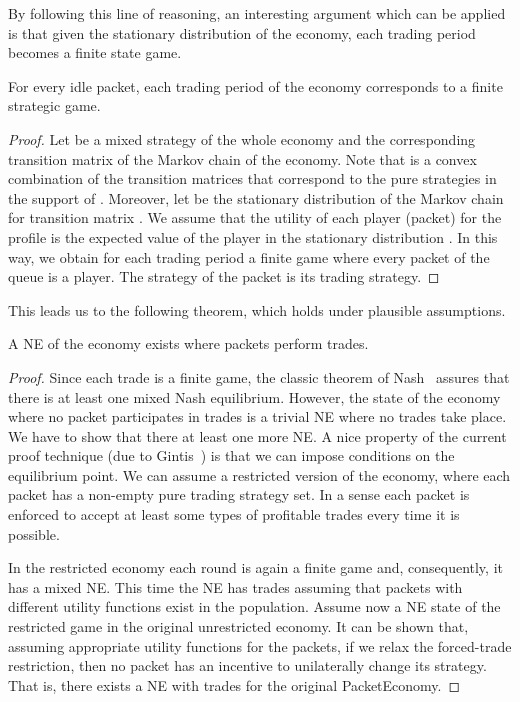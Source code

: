\documentclass[letterpaper,10pt]{llncs}
\newcommand{\hla}[1]{\hl{#1}}
\renewcommand{\hla}[1]{#1}
\begin{document}
\noindent
By following this line of reasoning, an interesting argument which can be applied is that
given the stationary distribution of the economy, each trading period becomes a finite state game. 

\begin{lemma}
\label{lem:FiniteGame}
For every idle packet, each trading period of the economy corresponds to a finite strategic game.
\end{lemma}

\begin{proof}
Let  be a mixed strategy of the whole economy and  the corresponding transition matrix of the Markov chain of the economy. 
\hla{Note that  is a convex combination of the transition
matrices  that correspond to the pure strategies  in the support of .}
Moreover, let  be the stationary distribution of the Markov chain for
transition matrix . We assume that the utility of each player (packet) 
for the profile  is the expected value of the player in the stationary 
distribution . In this way, we obtain for each trading period a finite 
game where every packet of the queue is a player. The strategy of the packet is its 
trading strategy. 
\end{proof}

\noindent
This leads us to the following theorem, which holds under plausible assumptions.

\begin{theorem}
\label{the:scenario1}
A NE of the economy exists where packets perform trades.
\end{theorem}

\begin{proof}
Since each trade is a finite game, the classic theorem of Nash~\cite{Nash:1950:Equilibrium,Nash:1951:NCG} assures that there is at least one mixed Nash equilibrium. However, the state of the economy where no packet participates in trades is a trivial
NE where no trades take place. We have to show that there at least one more NE.
A nice property of the current proof technique (due to Gintis~\cite{Gi97}) is that we can impose conditions on the 
equilibrium point. We can assume a restricted version of the economy, where each packet has a non-empty pure trading strategy set. In a sense each packet is enforced to accept at least some types of profitable trades every time it is possible. 

In the restricted economy each round is again a finite game and, consequently, it has a mixed NE. This time the NE has trades assuming that packets with different utility functions exist in the population. Assume now a NE state of the restricted game in the original unrestricted economy. 
\hla{It can be shown that,} assuming appropriate utility functions for the packets, 
if we relax the forced-trade restriction, then no packet has an incentive to 
unilaterally change its strategy.
That is, there exists a NE with trades for the original PacketEconomy.
\end{proof}
\end{document}
